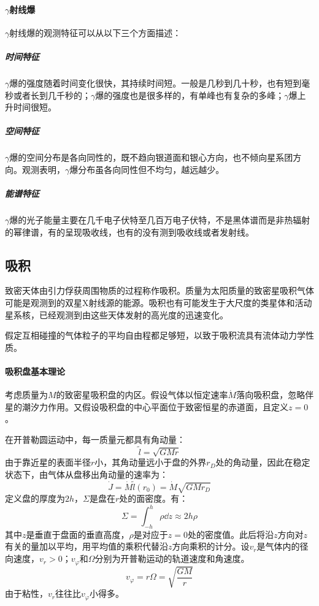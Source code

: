 \paragraph{$\gamma$射线爆}
$\gamma$射线爆的观测特征可以从以下三个方面描述：
\subparagraph{时间特征}$\gamma$爆的强度随着时间变化很快，其持续时间短。一般是几秒到几十秒，也有短到毫秒或者长到几千秒的；$\gamma$爆的强度也是很多样的，有单峰也有复杂的多峰；$\gamma$爆上升时间很短。
\subparagraph{空间特征}$\gamma$爆的空间分布是各向同性的，既不趋向银道面和银心方向，也不倾向星系团方向。观测表明，$\gamma$爆分布虽各向同性但不均匀，越远越少。
\subparagraph{能谱特征}$\gamma$爆的光子能量主要在几千电子伏特至几百万电子伏特，不是黑体谱而是非热辐射的幂律谱，有的呈现吸收线，也有的没有测到吸收线或者发射线。
\subsection{吸积}致密天体由引力俘获周围物质的过程称作吸积。质量为太阳质量的致密星吸积气体可能是观测到的双星X射线源的能源。吸积也有可能发生于大尺度的类星体和活动星系核，已经观测到由这些天体发射的高光度的迅速变化。

假定互相碰撞的气体粒子的平均自由程都足够短，以致于吸积流具有流体动力学性质。
\paragraph{吸积盘基本理论}
考虑质量为$M$的致密星吸积盘的内区。假设气体以恒定速率$\dot{M}$落向吸积盘，忽略伴星的潮汐力作用。又假设吸积盘的中心平面位于致密恒星的赤道面，且定义$z=0$。

在开普勒圆运动中，每一质量元都具有角动量：
\begin{equation}
	\tilde{l}=\sqrt{GMr}
\end{equation}
由于靠近星的表面半径$r$小，其角动量远小于盘的外界$r_{D}$处的角动量，因此在稳定状态下，由气体从盘移出角动量的速率为：
\begin{equation}
	\dot{J}=\dot{M}\tilde{l}(r_{0})=\dot{M}\sqrt{GMr_{D}}
\end{equation}
定义盘的厚度为$2h$，$\varSigma$是盘在$r$处的面密度。有：
\begin{equation}
	\varSigma=\int_{-h}^{h}\rho\dd z\approx2 h\rho
\end{equation}
其中$z$是垂直于盘面的垂直高度，$\rho$是对应于$z=0$处的密度值。此后将沿$z$方向对$z$有关的量加以平均，用平均值的乘积代替沿$z$方向乘积的计分。设$v_{r}$是气体内的径向速度，$v_{r}>0$；$v_{\varphi}$和$\Omega$分别为开普勒运动的轨道速度和角速度。
\begin{equation}
	v_{\varphi}=r\Omega=\sqrt{\frac{GM}{r}}
\end{equation}
由于粘性，$v_{r}$往往比$v_{\varphi}$小得多。


